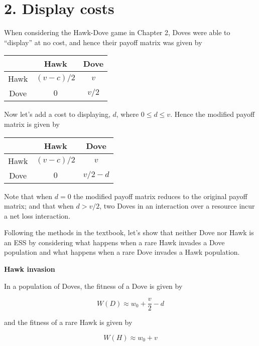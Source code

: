 \documentclass{article}
\begin{document}
\section*{2. Display costs}

When considering the Hawk-Dove game in Chapter 2, Doves were able to
``display'' at no cost, and hence their payoff matrix was given by

\begin{center}
    \begin{tabular}{ccc}
        & Hawk & Dove \\
        \hline
        Hawk & $(v - c) / 2$ & $v$ \\
        Dove & $0$ & $v / 2$ \\
        \hline
    \end{tabular}
\end{center}

Now let's add a cost to displaying, $d$, where $0 \leq d \leq v$. Hence
the modified payoff matrix is given by

\begin{center}
    \begin{tabular}{ccc}
        & Hawk & Dove \\
        \hline
        Hawk & $(v - c) / 2$ & $v$ \\
        Dove & $0$ & $v / 2 - d$ \\
        \hline
    \end{tabular}
\end{center}

Note that when $d = 0$ the modified payoff matrix reduces to the
original payoff matrix; and that when $d > v / 2$, two Doves in an
interaction over a resource incur a net loss interaction.

Following the methods in the textbook, let's show that neither Dove nor
Hawk is an ESS by considering what happens when a rare Hawk invades a
Dove population and what happens when a rare Dove invades a Hawk
population.

\textbf{Hawk invasion}

In a population of Doves, the fitness of a Dove is given by

\begin{equation*}
    W(D) \approx w_0 + \frac{v}{2} - d
\end{equation*}

and the fitness of a rare Hawk is given by

\begin{equation*}
    W(H) \approx w_0 + v
\end{equation*}
\end{document}
